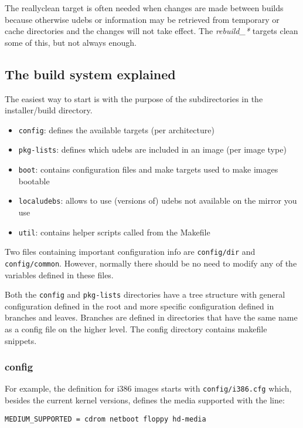 \documentclass[a4paper,10pt]{article}
\begin{document}
The reallyclean target is often needed when changes are made between builds because otherwise udebs or information may be retrieved from temporary or cache directories and the changes will not take effect. The \textit{rebuild\_*} targets clean some of this, but not always enough. 


\subsection{The build system explained}
The easiest way to start is with the purpose of the subdirectories in the installer/build directory. 

\begin{itemize}
\item \texttt{config}: defines the available targets (per architecture) 
\item \texttt{pkg-lists}: defines which udebs are included in an image (per image type) 
\item \texttt{boot}: contains configuration files and make targets used to make images bootable 
\item \texttt{localudebs}: allows to use (versions of) udebs not available on the mirror you use 
\item \texttt{util}: contains helper scripts called from the Makefile 
\end{itemize}

Two files containing important configuration info are \texttt{config/dir} and \texttt{config/common}. However, normally there should be no need to modify any of the variables defined in these files. 

Both the \texttt{config} and \texttt{pkg-lists} directories have a tree structure with general configuration defined in the root and more specific configuration defined in branches and leaves. Branches are defined in directories that have the same name as a config file on the higher level. The config directory contains makefile snippets. 

\subsubsection*{config}
For example, the definition for i386 images starts with \texttt{config/i386.cfg} which, besides the current kernel versions, defines the media supported with the line: 

\begin{verbatim}
MEDIUM_SUPPORTED = cdrom netboot floppy hd-media
\end{verbatim}
\end{document}
